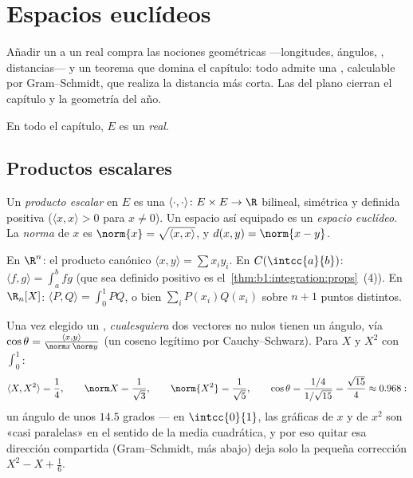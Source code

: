 \chapter{Espacios euclídeos}\label{ch:b1:euclid}

Añadir un  a un  real compra las
nociones geométricas ---longitudes, ángulos, ,
distancias--- y un teorema que domina el capítulo: todo 
admite una , calculable por Gram--Schmidt, que
realiza la distancia más corta. Las  del plano cierran el
capítulo y la geometría del año.

En todo el capítulo, $E$ es un  \emph{real}.

\section{Productos escalares}

\begin{definition}\label{def:b1:euclid:def}
Un \emph{producto escalar} en $E$ es una
 $\langle\cdot,\cdot\rangle \colon E \times E \to \R$
bilineal, simétrica y definida positiva ($\langle x, x\rangle > 0$
para $x \neq 0$). Un espacio  así equipado es un
\emph{espacio euclídeo}. La \emph{norma} de
$x$ es $\norm{x} = \sqrt{\langle x, x\rangle}$, y
$d(x, y) = \norm{x - y}$.
\end{definition}

\begin{example}\label{ex:b1:euclid:examples}
En $\R^n$: el producto canónico $\langle x, y\rangle = \sum x_i
y_i$. En $C(\intcc{a}{b})$: $\langle f, g \rangle = \int_a^b fg$ (que
sea definido positivo es el~\cref{thm:b1:integration:props}~(4)). En
$\R_n[X]$: $\langle P, Q\rangle = \int_0^1 PQ$, o bien
$\sum_{i} P(x_i)Q(x_i)$ sobre $n+1$ puntos distintos.
\end{example}

\begin{example}
\label{ex:b1:euclid:polyangle}
Una vez elegido un , \emph{cualesquiera} dos vectores
no nulos tienen un ángulo, vía
$\cos\theta = \frac{\langle x, y\rangle}{\norm x\,\norm y}$ (un
coseno legítimo por Cauchy--Schwarz). Para $X$ y $X^2$ con
$\int_0^1$:
\[
\langle X, X^2\rangle = \frac14, \qquad
\norm X = \frac1{\sqrt3}, \qquad \norm{X^2} = \frac1{\sqrt5},
\qquad
\cos\theta = \frac{1/4}{1/\sqrt{15}} = \frac{\sqrt{15}}{4}
\approx 0.968 :
\]
un ángulo de unos $14.5$ grados --- en $\intcc{0}{1}$, las gráficas
de $x$ y de $x^2$ son «casi paralelas» en el sentido de la media
cuadrática, y por eso quitar esa dirección compartida (Gram--Schmidt,
más abajo) deja solo la pequeña corrección $X^2 - X + \frac16$.
\end{example}

